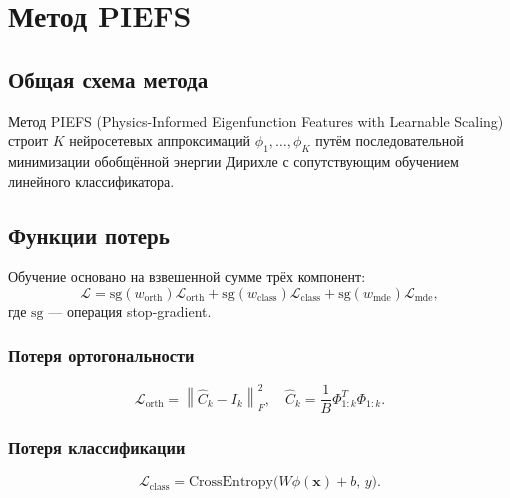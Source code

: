 \documentclass[14pt, a4paper, oneside]{extreport}
\theoremstyle{plain}
\theoremstyle{definition}
\newcommand{\norm}[1]{\left\lVert #1 \right\rVert}
\newcommand{\sg}{\mathrm{sg}}
\begin{document}

\chapter{Метод PIEFS}
\label{ch:method}


\section{Общая схема метода}

Метод PIEFS (Physics-Informed Eigenfunction Features with Learnable Scaling) строит $K$ нейросетевых аппроксимаций $\phi_1, \ldots, \phi_K$ путём последовательной минимизации обобщённой энергии Дирихле с сопутствующим обучением линейного классификатора.


\section{Функции потерь}
\label{sec:losses}

Обучение основано на взвешенной сумме трёх компонент:
\begin{equation}
  \mathcal{L} = \sg(w_{\text{orth}}) \mathcal{L}_{\text{orth}}
              + \sg(w_{\text{class}}) \mathcal{L}_{\text{class}}
              + \sg(w_{\text{mde}}) \mathcal{L}_{\text{mde}},
\end{equation}
где $\sg$ — операция stop-gradient.

\subsection{Потеря ортогональности}
\begin{equation}
  \mathcal{L}_{\text{orth}} = \norm{\hat{C}_k - I_k}_F^2,
  \quad \hat{C}_k = \frac{1}{B}\Phi_{1:k}^T \Phi_{1:k}.
\end{equation}

\subsection{Потеря классификации}
\begin{equation}
  \mathcal{L}_{\text{class}} = \text{CrossEntropy}\bigl(W\phi(\mathbf{x}) + b,\, y\bigr).
\end{equation}
\end{document}
